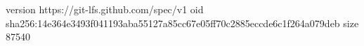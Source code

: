 version https://git-lfs.github.com/spec/v1
oid sha256:14e364e3493f041193aba55127a85cc67e05ff70c2885eccde6c1f264a079deb
size 87540
